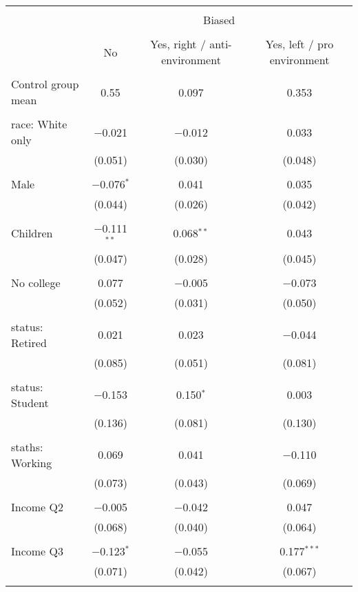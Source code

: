 
\begin{tabular}{@{\extracolsep{5pt}}lccc} 
\\[-1.8ex]\hline 
\hline \\[-1.8ex] 
 & \multicolumn{3}{c}{Biased} \\ 
\cline{2-4} 
\\[-1.8ex] & No & Yes, right / anti-environment & Yes, left / pro environment \\ 
\hline \\[-1.8ex] 
 Control group mean & 0.55 & 0.097 & 0.353  \\ \hline \\[-1.8ex] race: White only & $-$0.021 & $-$0.012 & 0.033 \\ 
  & (0.051) & (0.030) & (0.048) \\ 
  & & & \\ 
 Male & $-$0.076$^{*}$ & 0.041 & 0.035 \\ 
  & (0.044) & (0.026) & (0.042) \\ 
  & & & \\ 
 Children & $-$0.111$^{**}$ & 0.068$^{**}$ & 0.043 \\ 
  & (0.047) & (0.028) & (0.045) \\ 
  & & & \\ 
 No college & 0.077 & $-$0.005 & $-$0.073 \\ 
  & (0.052) & (0.031) & (0.050) \\ 
  & & & \\ 
 status: Retired & 0.021 & 0.023 & $-$0.044 \\ 
  & (0.085) & (0.051) & (0.081) \\ 
  & & & \\ 
 status: Student & $-$0.153 & 0.150$^{*}$ & 0.003 \\ 
  & (0.136) & (0.081) & (0.130) \\ 
  & & & \\ 
 staths: Working & 0.069 & 0.041 & $-$0.110 \\ 
  & (0.073) & (0.043) & (0.069) \\ 
  & & & \\ 
 Income Q2 & $-$0.005 & $-$0.042 & 0.047 \\ 
  & (0.068) & (0.040) & (0.064) \\ 
  & & & \\ 
 Income Q3 & $-$0.123$^{*}$ & $-$0.055 & 0.177$^{***}$ \\ 
  & (0.071) & (0.042) & (0.067) \\ 
  & & & \\ 

\end{tabular}
